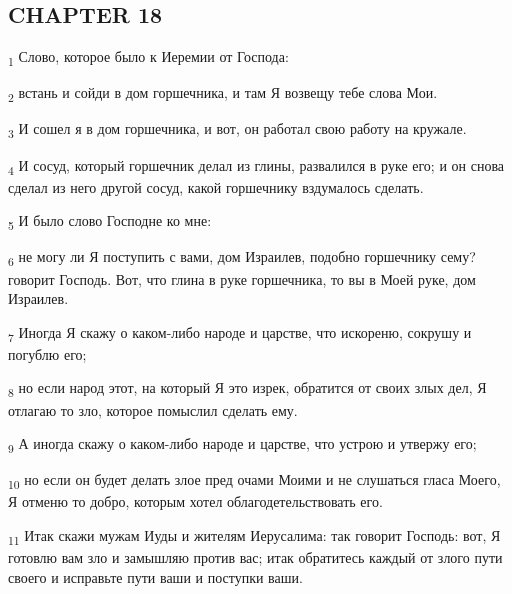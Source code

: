 \subsection{CHAPTER 18}
\begin{tcolorbox}
\textsubscript{1} Слово, которое было к Иеремии от Господа:
\end{tcolorbox}
\begin{tcolorbox}
\textsubscript{2} встань и сойди в дом горшечника, и там Я возвещу тебе слова Мои.
\end{tcolorbox}
\begin{tcolorbox}
\textsubscript{3} И сошел я в дом горшечника, и вот, он работал свою работу на кружале.
\end{tcolorbox}
\begin{tcolorbox}
\textsubscript{4} И сосуд, который горшечник делал из глины, развалился в руке его; и он снова сделал из него другой сосуд, какой горшечнику вздумалось сделать.
\end{tcolorbox}
\begin{tcolorbox}
\textsubscript{5} И было слово Господне ко мне:
\end{tcolorbox}
\begin{tcolorbox}
\textsubscript{6} не могу ли Я поступить с вами, дом Израилев, подобно горшечнику сему? говорит Господь. Вот, что глина в руке горшечника, то вы в Моей руке, дом Израилев.
\end{tcolorbox}
\begin{tcolorbox}
\textsubscript{7} Иногда Я скажу о каком-либо народе и царстве, что искореню, сокрушу и погублю его;
\end{tcolorbox}
\begin{tcolorbox}
\textsubscript{8} но если народ этот, на который Я это изрек, обратится от своих злых дел, Я отлагаю то зло, которое помыслил сделать ему.
\end{tcolorbox}
\begin{tcolorbox}
\textsubscript{9} А иногда скажу о каком-либо народе и царстве, что устрою и утвержу его;
\end{tcolorbox}
\begin{tcolorbox}
\textsubscript{10} но если он будет делать злое пред очами Моими и не слушаться гласа Моего, Я отменю то добро, которым хотел облагодетельствовать его.
\end{tcolorbox}
\begin{tcolorbox}
\textsubscript{11} Итак скажи мужам Иуды и жителям Иерусалима: так говорит Господь: вот, Я готовлю вам зло и замышляю против вас; итак обратитесь каждый от злого пути своего и исправьте пути ваши и поступки ваши.
\end{tcolorbox}
